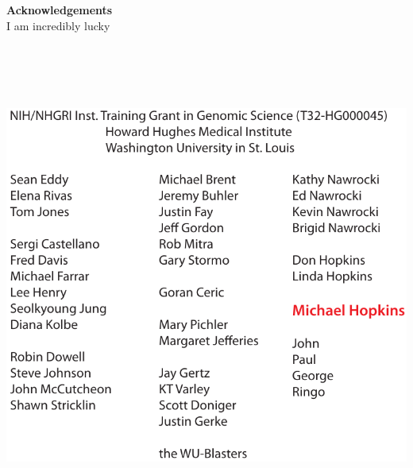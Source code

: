 \documentclass[landscape]{slides}
\begin{document}
\begin{slide}

\large
\begin{center}
\large{\textbf{Acknowledgements}} \\
I am incredibly lucky

\includegraphics[height=6.3in]{figs/ack}

\end{center}

\vfill
\end{slide}
\begin{slide}
\end{slide}
\end{document}
